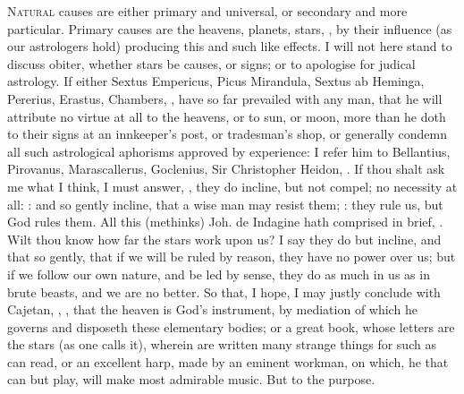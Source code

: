 {{\lettrine{N}{atural} causes are either primary and universal, or secondary and more
particular. Primary causes are the heavens, planets, stars, \etc{}, by
their influence (as our astrologers hold) producing this and such like
effects. I will not here stand to discuss obiter, whether stars be
causes, or signs; or to apologise for judical astrology. If either
Sextus Empericus, Picus Mirandula, Sextus ab Heminga, Pererius,
Erastus, Chambers, \etc{}, have so far prevailed with any man, that he
will attribute no virtue at all to the heavens, or to sun, or moon,
more than he doth to their signs at an innkeeper's post, or tradesman's
shop, or generally condemn all such astrological aphorisms approved by
experience: I refer him to Bellantius, Pirovanus, Marascallerus,
Goclenius, Sir Christopher Heidon, \etc{}. If thou shalt ask me what I
think, I must answer, , they do incline, but not
compel; no necessity at all: : and so gently
incline, that a wise man may resist them; :
they rule us, but God rules them. All this (methinks) Joh. de
Indagine hath comprised in brief,  \etc{}. Wilt thou know how far the stars work upon us? I
say they do but incline, and that so gently, that if we will be ruled
by reason, they have no power over us; but if we follow our own nature,
and be led by sense, they do as much in us as in brute beasts, and we
are no better. So that, I hope, I may justly conclude with
Cajetan, , \etc{}, that the
heaven is God's instrument, by mediation of which he governs and
disposeth these elementary bodies; or a great book, whose letters are
the stars (as one calls it), wherein are written many strange things
for such as can read, or an excellent harp, made by an eminent
workman, on which, he that can but play, will make most admirable
music. But to the purpose.

}}
